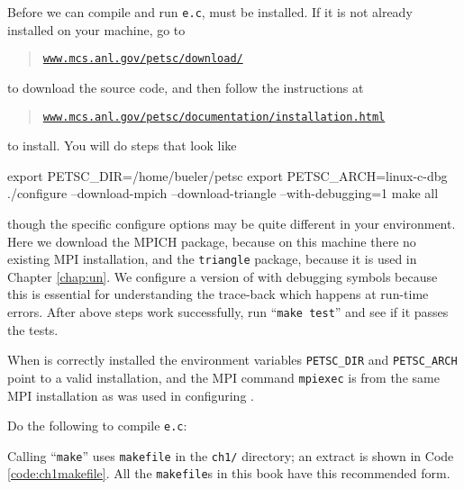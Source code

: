 
Before we can compile and run \texttt{e.c}, \PETSc must be installed.  If it is not already installed on your machine, go to
\begin{quote}
\href{http://www.mcs.anl.gov/petsc/download/index.html}{\texttt{www.mcs.anl.gov/petsc/download/}}
\end{quote}
to download the source code, and then follow the instructions at
\begin{quote}
\href{http://www.mcs.anl.gov/petsc/documentation/installation.html}{\texttt{www.mcs.anl.gov/petsc/documentation/installation.html}}
\end{quote}
to install.  You will do steps that look like
\begin{cline}
export PETSC_DIR=/home/bueler/petsc
export PETSC_ARCH=linux-c-dbg
./configure --download-mpich --download-triangle --with-debugging=1
make all
\end{cline}
though the specific configure options may be quite different in your environment.  Here we download the MPICH package, because on this machine there no existing MPI installation, and the \texttt{triangle} package, because it is used in Chapter \ref{chap:un}.  We configure a version of \PETSc with debugging symbols because this is essential for understanding the trace-back which happens at run-time errors.  After above steps work successfully, run ``\texttt{make test}'' and see if it passes the tests.

When \PETSc is correctly installed the environment variables \texttt{PETSC\_DIR} and \texttt{PETSC\_ARCH} point to a valid installation, and the MPI command \texttt{mpiexec} is from the same MPI installation as was used in configuring \PETSc.

Do the following to compile \texttt{e.c}:
Calling ``\texttt{make}'' uses \texttt{makefile} in the \texttt{ch1/} directory; an extract is shown in Code \ref{code:ch1makefile}.  All the \texttt{makefile}s in this book have this recommended \citep{petsc-user-ref} form.

